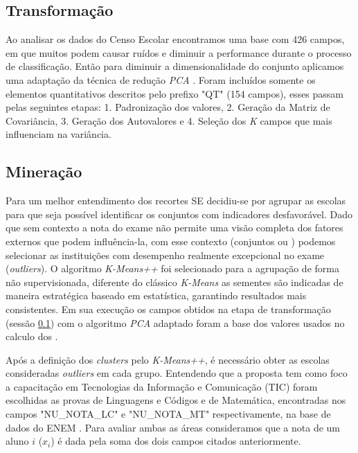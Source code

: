 \documentclass[12pt]{article}
\begin{document}
\subsection{Transformação}
\label{sec:me_trasf}

Ao analisar os dados do Censo Escolar \cite{misc:micro_escolas} encontramos uma base com 426 campos, em que muitos podem causar ruídos e diminuir a performance durante o processo de classificação. Então para diminuir a dimensionalidade do conjunto aplicamos uma adaptação da técnica de redução \textit{PCA} \cite{book:pca}. Foram incluídos somente os elementos quantitativos descritos pelo prefixo "QT" (154 campos), esses passam pelas seguintes etapas: 1. Padronização dos valores, 2. Geração da Matriz de Covariância, 3. Geração dos Autovalores e 4. Seleção dos \textit{K} campos que mais influenciam na variância.

\subsection{Mineração}

Para um melhor entendimento dos recortes SE decidiu-se por agrupar as escolas para que seja possível identificar os conjuntos com indicadores desfavorável. Dado que sem contexto a nota do exame não permite uma visão completa dos fatores externos que podem influência-la, com esse contexto (conjuntos ou ) podemos selecionar as instituições com desempenho realmente excepcional no exame (\textit{outliers}). O algoritmo \textit{K-Means++} \cite{article:kmeanspp} foi selecionado para a agrupação de forma não supervisionada, diferente do clássico \textit{K-Means} as sementes são indicadas de maneira estratégica baseado em estatística, garantindo resultados mais consistentes. Em sua execução os campos obtidos na etapa de transformação (sessão \ref{sec:me_trasf}) com o algoritmo \textit{PCA} adaptado foram a base dos valores usados no calculo dos .

Após a definição dos \textit{clusters} pelo \textit{K-Means++}, é necessário obter as escolas consideradas \textit{outliers} em cada grupo. Entendendo que a proposta tem como foco a capacitação em Tecnologias da Informação e Comunicação (TIC) foram escolhidas as provas de Linguagens e Códigos e de Matemática, encontradas nos campos "NU\_NOTA\_LC" e "NU\_NOTA\_MT" respectivamente, na base de dados do ENEM \cite{misc:micro_enem}. Para avaliar ambas as áreas consideramos que a nota de um aluno $i$ ($x_i$) é dada pela soma dos dois campos citados anteriormente.
\end{document}
